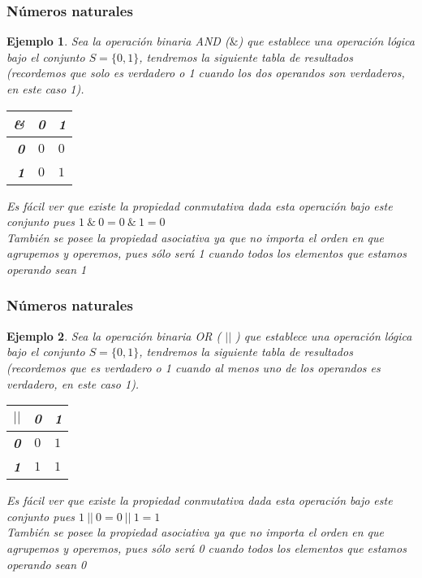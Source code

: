 \documentclass[11pt]{beamer}
\newtheorem{ejem}{Ejemplo}
\begin{document}
\begin{frame}
\frametitle{Números naturales}
\begin{ejem}
Sea la operación binaria AND ($\&$) que establece una operación lógica bajo el conjunto $S = \{0,1\}$, tendremos la siguiente tabla de resultados (recordemos que solo es verdadero o 1 cuando los dos operandos son verdaderos, en este caso 1).
\begin{center}
\begin{tabular}{| r | c | l |}
\hline
\textbf{\&} & \textbf{0} & \textbf{1}	\\ \hline
\textbf{0} & $0$ & $0$\\
\textbf{1} & $0$ & $1$\\ \hline
\end{tabular}
\end{center}
Es fácil ver que existe la propiedad conmutativa dada esta operación bajo este conjunto pues $1 ~ \& ~ 0 = 0 ~ \& ~ 1 = 0$\\
También se posee la propiedad asociativa ya que no importa el orden en que agrupemos y operemos, pues sólo será 1 cuando todos los elementos que estamos operando sean 1
\end{ejem}
\end{frame}

\begin{frame}
\frametitle{Números naturales}
\begin{ejem}
Sea la operación binaria OR ( $||$ ) que establece una operación lógica bajo el conjunto $S = \{0,1\}$, tendremos la siguiente tabla de resultados (recordemos que es verdadero o 1 cuando al menos uno de los operandos es verdadero, en este caso 1).
\begin{center}
\begin{tabular}{| r | c | l |}
\hline
\textbf{$||$} & \textbf{0} & \textbf{1}	\\ \hline
\textbf{0} & $0$ & $1$\\
\textbf{1} & $1$ & $1$\\ \hline
\end{tabular}
\end{center}
Es fácil ver que existe la propiedad conmutativa dada esta operación bajo este conjunto pues $1 ~ || ~ 0 = 0 ~ || ~ 1 = 1$\\
También se posee la propiedad asociativa ya que no importa el orden en que agrupemos y operemos, pues sólo será 0 cuando todos los elementos que estamos operando sean 0
\end{ejem}
\end{frame}
\end{document}
